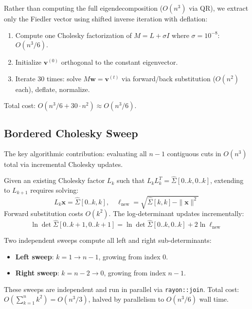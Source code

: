 \documentclass[10pt,letterpaper]{article}
\begin{document}
Rather than computing the full eigendecomposition ($O(n^3)$ via QR), we extract only the Fiedler vector using shifted inverse iteration with deflation:

\begin{enumerate}[nosep]
  \item Compute one Cholesky factorization of $M = L + \sigma I$ where $\sigma = 10^{-8}$: $O(n^3/6)$.
  \item Initialize $\mathbf{v}^{(0)}$ orthogonal to the constant eigenvector.
  \item Iterate 30 times: solve $M\mathbf{w} = \mathbf{v}^{(t)}$ via forward/back substitution ($O(n^2)$ each), deflate, normalize.
\end{enumerate}

Total cost: $O(n^3/6 + 30 \cdot n^2) \approx O(n^3/6)$.

\subsection{Bordered Cholesky Sweep}

The key algorithmic contribution: evaluating all $n-1$ contiguous cuts in $O(n^3)$ total via incremental Cholesky updates.

Given an existing Cholesky factor $L_k$ such that $L_k L_k^T = \hat{\Sigma}[0..k, 0..k]$, extending to $L_{k+1}$ requires solving:
\begin{equation}
  L_k \mathbf{x} = \hat{\Sigma}[0..k, k], \quad \ell_{\text{new}} = \sqrt{\hat{\Sigma}[k,k] - \|\mathbf{x}\|^2}
\end{equation}
Forward substitution costs $O(k^2)$. The log-determinant updates incrementally:
\begin{equation}
  \ln \det \hat{\Sigma}[0..k\!+\!1, 0..k\!+\!1] = \ln \det \hat{\Sigma}[0..k, 0..k] + 2\ln \ell_{\text{new}}
\end{equation}

Two independent sweeps compute all left and right sub-determinants:
\begin{itemize}[nosep]
  \item \textbf{Left sweep}: $k = 1 \to n-1$, growing from index 0.
  \item \textbf{Right sweep}: $k = n-2 \to 0$, growing from index $n-1$.
\end{itemize}

These sweeps are independent and run in parallel via \texttt{rayon::join}. Total cost: $O(\sum_{k=1}^{n} k^2) = O(n^3/3)$, halved by parallelism to $O(n^3/6)$ wall time.
\end{document}
